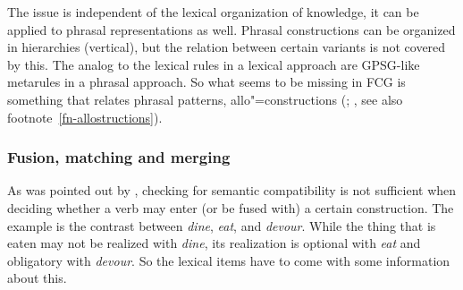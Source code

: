 The issue is independent of the lexical organization of knowledge, it can be applied to phrasal
representations as well. Phrasal constructions can be organized in hierarchies (vertical), but the
relation between certain variants is not covered by this. The analog to the lexical rules in a
lexical approach are GPSG-like metarules in a phrasal approach. So what seems to be missing in FCG
is something that relates phrasal patterns, \eg allo"=constructions (\citealp{Cappelle2006a}; \citealp[]{Goldberg2014a}, see also footnote~\ref{fn-allostructions}).


\subsubsection{Fusion, matching and merging}

As was pointed out by \citet[--90]{Dowty89b-u}, checking for semantic compatibility is not sufficient
when deciding whether a verb may enter (or be fused with) a certain construction. The example is
the contrast between \emph{dine}, \emph{eat}, and \emph{devour}. While the thing that is eaten may
not be realized with \emph{dine}, its realization is optional with \emph{eat} and obligatory with
\emph{devour}. So the lexical items have to come with some information about
this. 

